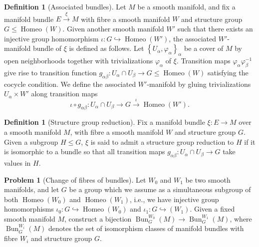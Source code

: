 \documentclass[reqno]{amsart}
\theoremstyle{definition}
\newtheorem{definition}[theorem]{Definition}
\newtheorem{problem}[theorem]{Problem}
\theoremstyle{remark}
\DeclareMathOperator{\Homeo}{Homeo}
\DeclareMathOperator{\Bun}{Bun}
\begin{document}
    \begin{definition}[Associated bundles]
        Let $M$ be a smooth manifold, and
        fix a manifold bundle
        $E \stackrel{\xi}{\to } M$ with fibre a smooth
        manifold $W$ and structure group
        $G \le \Homeo (W)$. Given another smooth manifold
        $W'$ such that there exists an injective group
        homomorphism $\iota \colon G \hookrightarrow
        \Homeo\left( W' \right) $, the associated
        $W'$-manifold bundle of $\xi$ is defined
        as follows. Let
        $\left\{ U_{\alpha}, \varphi_{\alpha} \right\}_{\alpha}$ 
        be a cover of $M$ by open neighborhoods together with
        trivializations
        $\varphi_{\alpha}$ of $\xi$. Transition maps
        $\varphi_{\alpha} \varphi_{\beta}^{-1}$ give rise
        to transition function
        $g_{\alpha \beta} \colon U_{\alpha} \cap
        U_{\beta} \to G \le \Homeo(W)$ satisfying the
        cocycle condition. We define the associated
        $W'$-manifold by gluing trivializations
        $U_{\alpha} \times W'$ along transition maps
        \[
        \iota \circ g_{\alpha\beta} \colon U_{\alpha}
        \cap U_{\beta} \to G 
        \stackrel{\iota}{\to } \Homeo\left( W' \right) .
        \] 
    \end{definition}

    \begin{definition}[Structure group reduction]
        Fix a manifold bundle
        $\xi \colon E \to M$ over a smooth manifold
        $M$, with fibre a smooth manifold $W$ and structure
        group $G$. Given a subgroup $H \le G$, $\xi$ 
        is said to admit a structure group reduction to
        $H$ if it is isomorphic to a bundle so that all transition
        maps $g_{\alpha \beta} \colon U_{\alpha} \cap
        U_{\beta} \to G$ take values in $H$.
    \end{definition}

    \begin{problem}[Change of fibres of bundles]
        Let $W_0$ and $W_1$ be two smooth manifolds, and
        let $G$ be a group which we assume as a simultaneous
        subgroup of both $\Homeo (W_0)$ and
        $\Homeo(W_1)$, i.e., we have injective group homomorphisms
        $\iota_0 \colon G \hookrightarrow
        \Homeo(W_0)$ and
        $\iota_1 \colon G \hookrightarrow (W_1)$. Given a
        fixed smooth manifold $M$, construct a bijection
        $\Bun_G^{W_0}(M) \to \Bun_G^{W_1}(M)$, where
        $\Bun_G^{W_i}(M)$ denotes the set of
        isomorphism classes of manifold bundles with fibre
        $W_i$ and structure group $G$.
    \end{problem}
\end{document}
